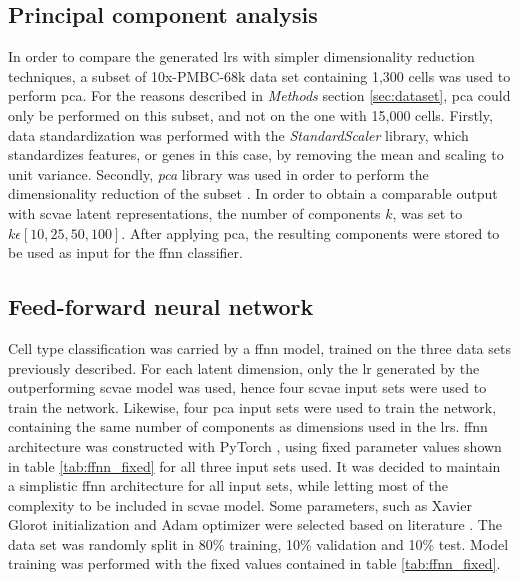 \documentclass{article}
\begin{document}
\subsection{Principal component analysis}
\label{sec:pca}
In order to compare the generated \glspl{lr} with simpler dimensionality reduction techniques, a subset of 10x-PMBC-68k data set containing 1,300 cells was used to perform \gls{pca}. 
For the reasons described in \textit{Methods} section \ref{sec:dataset}, \gls{pca} could only be performed on this subset, and not on the one with 15,000 cells.
Firstly, data standardization was performed with the \emph{StandardScaler} library, which standardizes features, or genes in this case, by removing the mean and scaling to unit variance. 
Secondly, \emph{\gls{pca}} library was used in order to perform the dimensionality reduction of the subset \cite{scikit-learn}.
In order to obtain a comparable output with \gls{scvae} latent representations, the number of components $k$, was set to $k\epsilon[10, 25, 50, 100]$. 
After applying \gls{pca}, the resulting components were stored to be used as input for the \gls{ffnn} classifier.

\subsection{Feed-forward neural network}
\label{sec:ffnn}
Cell type classification was carried by a \gls{ffnn} model, trained on the three data sets previously described.
For each latent dimension, only the \gls{lr} generated by the outperforming \gls{scvae} model was used, hence four \gls{scvae} input sets were used to train the network. 
Likewise, four \gls{pca} input sets were used to train the network, containing the same number of components as dimensions used in the \glspl{lr}.
\gls{ffnn} architecture was constructed with PyTorch \cite{pytorch}, using fixed parameter values shown in table \ref{tab:ffnn_fixed} for all three input sets used.
It was decided to maintain a simplistic \gls{ffnn} architecture for all input sets, while letting most of the complexity to be included in \gls{scvae} model.
Some parameters, such as Xavier Glorot initialization and Adam optimizer were selected based on literature \cite{gronbech2020, Eraslan2019, Ma2019, Johansen2019}. 
The data set was randomly split in 80\% training, 10\% validation and 10\% test. 
Model training was performed with the fixed values contained in table \ref{tab:ffnn_fixed}. 
\end{document}
